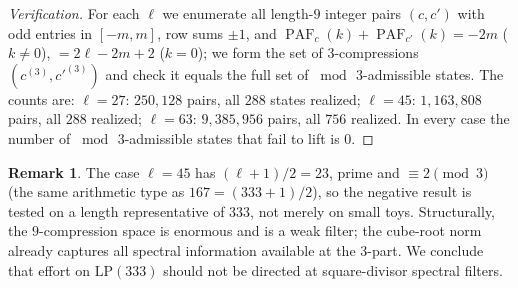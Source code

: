 \documentclass[11pt]{article}
\theoremstyle{definition}
\newtheorem{remark}{Remark}
\DeclareMathOperator{\PAF}{PAF}
\begin{document}
\begin{proof}[Verification]
For each $\ell$ we enumerate all length-$9$ integer pairs $(c,c')$ with odd entries in $[-m,m]$, row sums
$\pm1$, and $\PAF_c(k)+\PAF_{c'}(k)=-2m$ ($k\neq0$), $=2\ell-2m+2$ ($k=0$); we form the set of $3$-compressions
$(c^{(3)},c'^{(3)})$ and check it equals the full set of $\bmod\,3$-admissible states. The counts are:
$\ell=27$: $250{,}128$ pairs, all $288$ states realized; $\ell=45$: $1{,}163{,}808$ pairs, all $288$ realized;
$\ell=63$: $9{,}385{,}956$ pairs, all $756$ realized. In every case the number of $\bmod\,3$-admissible states
that fail to lift is $0$.
\end{proof}

\begin{remark}
The case $\ell=45$ has $(\ell+1)/2=23$, prime and $\equiv2\pmod3$ (the same arithmetic type as
$167=(333+1)/2$), so the negative result is tested on a length representative of $333$, not merely on small
toys. Structurally, the $9$-compression space is enormous and is a weak filter; the cube-root norm already
captures all spectral information available at the $3$-part. We conclude that effort on $\mathrm{LP}(333)$
should not be directed at square-divisor spectral filters.
\end{remark}
\end{document}
